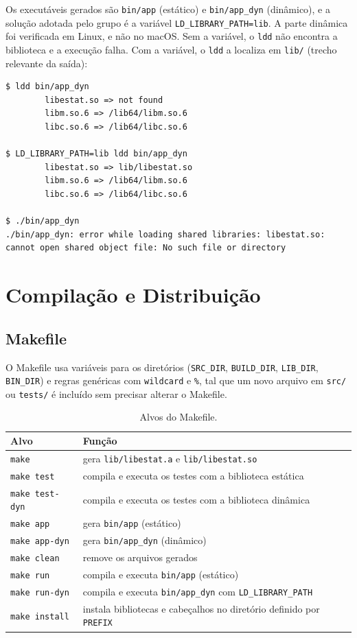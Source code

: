 \documentclass[12pt,a4paper]{article}
\newcommand{\cod}[1]{\texttt{#1}}
\begin{document}
Os executáveis gerados são \cod{bin/app} (estático) e \cod{bin/app\_dyn} (dinâmico), e a solução adotada pelo grupo é a variável \cod{LD\_LIBRARY\_PATH=lib}. A parte dinâmica foi verificada em Linux, e não no macOS. Sem a variável, o \cod{ldd} não encontra a biblioteca e a execução falha. Com a variável, o \cod{ldd} a localiza em \cod{lib/} (trecho relevante da saída):
\begin{lstlisting}[style=shell]
$ ldd bin/app_dyn
        libestat.so => not found
        libm.so.6 => /lib64/libm.so.6
        libc.so.6 => /lib64/libc.so.6

$ LD_LIBRARY_PATH=lib ldd bin/app_dyn
        libestat.so => lib/libestat.so
        libm.so.6 => /lib64/libm.so.6
        libc.so.6 => /lib64/libc.so.6

$ ./bin/app_dyn
./bin/app_dyn: error while loading shared libraries: libestat.so: cannot open shared object file: No such file or directory
\end{lstlisting}


\section{Compilação e Distribuição}

\subsection{Makefile}
O Makefile usa variáveis para os diretórios (\cod{SRC\_DIR}, \cod{BUILD\_DIR},
\cod{LIB\_DIR}, \cod{BIN\_DIR}) e regras genéricas com \cod{wildcard} e
\cod{\%}, tal que um novo arquivo em \cod{src/} ou \cod{tests/} é
incluído sem precisar alterar o Makefile.

\begin{table}[h]
\centering
\small
\begin{tabular}{@{}ll@{}}
\toprule
Alvo & Função \\
\midrule
\cod{make}          & gera \cod{lib/libestat.a} e \cod{lib/libestat.so} \\
\cod{make test}     & compila e executa os testes com a biblioteca estática \\
\cod{make test-dyn} & compila e executa os testes com a biblioteca dinâmica \\
\cod{make app}      & gera \cod{bin/app} (estático) \\
\cod{make app-dyn}  & gera \cod{bin/app\_dyn} (dinâmico) \\
\cod{make clean}    & remove os arquivos gerados \\
\cod{make run}      & compila e executa \cod{bin/app} (estático) \\
\cod{make run-dyn}  & compila e executa \cod{bin/app\_dyn} com \cod{LD\_LIBRARY\_PATH} \\
\cod{make install}   & instala bibliotecas e cabeçalhos no diretório definido por \cod{PREFIX} \\
\bottomrule
\end{tabular}
\caption{Alvos do Makefile.}
\end{table}
\end{document}
